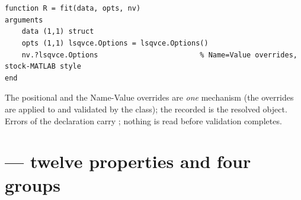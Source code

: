 \section{}

\begin{lstlisting}
function R = fit(data, opts, nv)
arguments
    data (1,1) struct
    opts (1,1) lsqvce.Options = lsqvce.Options()
    nv.?lsqvce.Options                        % Name=Value overrides, stock-MATLAB style
end
\end{lstlisting}
The positional  and the Name-Value overrides are \emph{one} mechanism (the overrides are applied to  and validated by the class); the recorded  is the resolved object. Errors of the declaration carry ; nothing is read before validation completes.

\section{ --- twelve properties and four groups}

